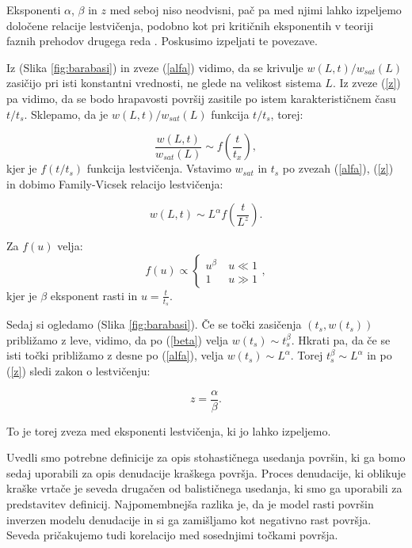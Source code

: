 \documentclass[a4paper, twoside, 12pt]{book}
\begin{document}
Eksponenti $\alpha$, $\beta$ in $z$ med seboj niso neodvisni, pač pa med njimi lahko izpeljemo določene relacije lestvičenja, podobno kot pri kritičnih eksponentih v teoriji faznih prehodov drugega reda \cite{stanley1987introduction}. Poskusimo izpeljati te povezave.

Iz (Slika \ref{fig:barabasi}) in zveze (\ref{alfa}) vidimo, da se krivulje $w(L,t)/w_{sat}(L)$ zasičijo pri isti konstantni vrednosti, ne glede na velikost sistema $L$. Iz zveze (\ref{z}) pa vidimo, da se bodo hrapavosti površij zasitile po istem karakterističnem času $t/t_s$. Sklepamo, da je $w(L,t)/w_{sat}(L)$ funkcija $t/t_s$, torej:

  \begin{equation}
    \frac{w(L,t)}{w_{sat}(L)} \sim f(\frac{t}{t_x}),
  \end{equation}
kjer je $f(t/t_s)$ funkcija lestvičenja. Vstavimo $w_{sat}$ in $t_s$ po zvezah (\ref{alfa}), (\ref{z}) in dobimo Family-Vicsek relacijo lestvičenja:

  \begin{equation}
    w(L,t) \sim L^\alpha f(\frac{t}{L^z}).
    \label{family-vicsek}
  \end{equation}

Za $f(u)$ velja:
  \begin{equation}
    f(u) \propto \left \{ \begin{array}{lr} u^{\beta} & \ u\ll 1 \\
      1 & \ u\gg1\end{array}, \right.
    \end{equation}
kjer je $\beta$ eksponent rasti in $u=\frac{t}{t_s}$.

Sedaj si ogledamo (Slika \ref{fig:barabasi}). Če se točki zasičenja $(t_s,w(t_s))$ približamo z leve, vidimo, da po (\ref{beta}) velja $w(t_s) \sim t_s^\beta$. Hkrati pa, da če se isti točki približamo z desne po (\ref{alfa}), velja $w(t_s) \sim L^\alpha$. Torej $t_s^\beta \sim L^\alpha$ in po (\ref{z}) sledi zakon o lestvičenju:

    \begin{equation}
      z = \frac{\alpha}{\beta}.
    \end{equation}

To je torej zveza med eksponenti lestvičenja, ki jo lahko izpeljemo.

Uvedli smo potrebne definicije za opis stohastičnega usedanja površin, ki ga bomo sedaj uporabili za opis denudacije kraškega površja. Proces denudacije, ki oblikuje kraške vrtače je seveda drugačen od balističnega usedanja, ki smo ga uporabili za predstavitev definicij. Najpomembnejša razlika je, da je model rasti površin inverzen modelu denudacije in si ga zamišljamo kot negativno rast površja. Seveda pričakujemo tudi korelacijo med sosednjimi točkami površja.
\end{document}
